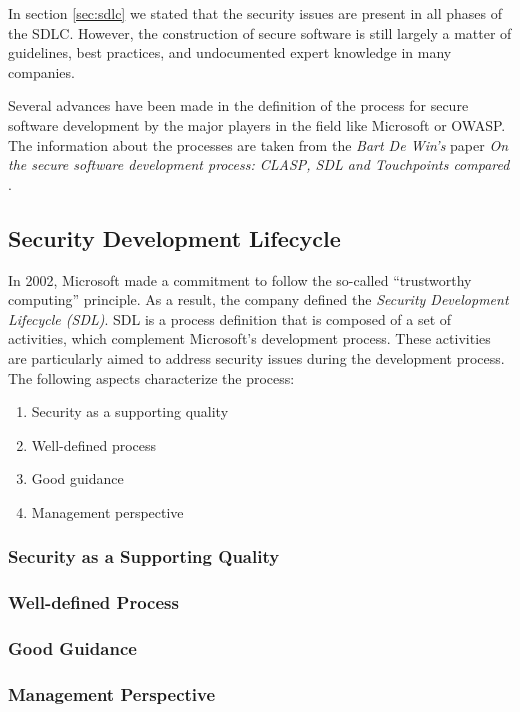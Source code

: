 \documentclass[12pt,a4,twoside]{article}
\begin{document}
In section \ref{sec:sdlc} we stated that the security issues are present in all phases of the SDLC. However, the construction of secure software is still largely a matter of guidelines, best practices, and undocumented expert knowledge in many companies. \cite{on_secure_software}

Several advances have been made in the definition of the process for secure software development by the major players in the field like Microsoft or OWASP. The information about the processes are taken from the \textit{Bart De Win's} paper \textit{On the secure software development process: CLASP, SDL and Touchpoints compared} \cite{on_secure_software}.

\subsection{Security Development Lifecycle}

In 2002, Microsoft made a commitment to follow the so-called ``trustworthy computing'' principle. As a result, the company defined the \textit{Security Development Lifecycle (SDL)}. SDL is a process definition that is composed of a set of activities, which complement Microsoft's development process. These activities are particularly aimed to address security issues during the development process. The following aspects characterize the process:

\begin{enumerate}
    \item Security as a supporting quality
    \item Well-defined process
    \item Good guidance
    \item Management perspective
\end{enumerate}

\subsubsection{Security as a Supporting Quality}



\subsubsection{Well-defined Process}

\subsubsection{Good Guidance}

\subsubsection{Management Perspective}











\newpage
\printbibliography
\end{document}
